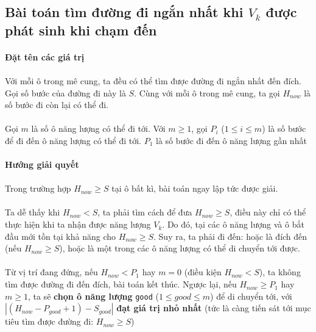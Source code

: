 \subsection{Bài toán tìm đường đi ngắn nhất khi $V_k$ được phát sinh khi chạm đến}

\paragraph{Đặt tên các giá trị}
\paragraph{}{Với mỗi ô trong mê cung, ta đều có thể tìm được đường đi ngắn nhất đến đích. Gọi số bước của đường đi này là $S$. Cùng với mỗi ô trong mê cung, ta gọi $H_{now}$ là số bước đi còn lại có thể đi.}
\paragraph{}{Gọi $m$ là số ô năng lượng có thể đi tới. Với $m \ge 1$, gọi $P_i$ ($1 \le i \le m$) là số bước để đi đến ô năng lượng có thể đi tới. $P_1$ là số bước đi đến ô năng lượng gần nhất}

\paragraph{Hướng giải quyết}
\paragraph{}{Trong trường hợp $H_{now}\ge S$ tại ô bất kì, bài toán ngay lập tức được giải.}

\paragraph{}{Ta dễ thấy khi $H_{now} < S$, ta phải tìm cách để đưa $H_{now}\ge S$, điều này chỉ có thể thực hiện khi ta nhận được năng lượng $V_k$. Do đó, tại các ô năng lượng và ô bắt đầu mới tồn tại khả năng cho $H_{now}\ge S$}. Suy ra, ta phải đi đến: hoặc là đích đến (nếu $H_{now}\ge S$), hoặc là một trong các ô năng lượng có thể di chuyển tới được.

\paragraph{}{Từ vị trí đang đứng, nếu $H_{now} < P_1$ hay $m = 0$ (điều kiện $H_{now} < S$), ta không tìm được đường đi đến đích, bài toán kết thúc.} Ngược lại, nếu $H_{now} \ge P_1$ hay $m \ge 1$, ta sẽ \textbf{chọn ô năng lượng} \texttt{good} ($1 \le good \le m$) để di chuyển tới, với $\left| (H_{now}-P_{good} + 1)-S_{good} \right|$ \textbf{đạt giá trị nhỏ nhất} (tức là càng tiến sát tới mục tiêu tìm được đường đi: $H_{now} \ge S$)


